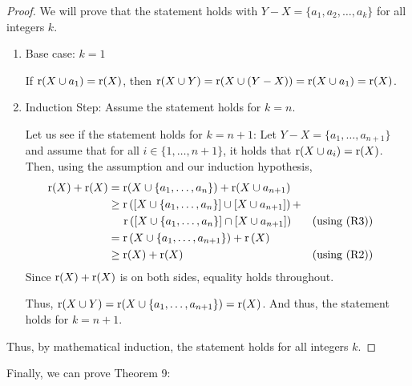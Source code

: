 \begin{proof}
    We will prove that the statement holds with $Y-X = \{a_1,a_2,\dots,a_k\}$ for all integers $k$.
    \begin{enumerate}
        \item Base case: $k=1$

        If $\operatorname{r}(X\cup a_1)=\operatorname{r}(X)$, then $\operatorname{r}(X\cup Y)=\operatorname{r}(X\cup(Y-X))=\operatorname{r}(X\cup a_1)=\operatorname{r}(X)$.
        \item Induction Step: Assume the statement holds for $k=n$. 
        
        Let us see if the statement holds for $k=n+1$: Let $Y-X=\{a_1,\dots,a_{n+1}\}$ and assume that for all $i\in\{1,\dots,n+1\}$, it holds that $\operatorname{r}(X\cup a_i)=\operatorname{r}(X)$. Then, using the assumption and our induction hypothesis, 
        \begin{align*}
            \operatorname{r}(X)+\operatorname{r}(X) &= \operatorname{r}(X\cup \{a_1,\dots,a_n\})+\operatorname{r}(X\cup a_{n+1}) 
            \\&\geq \operatorname{r}\left(\left[X\cup\{a_1,\dots,a_n\}\right]\cup \left[X\cup a_{n+1}\right]\right) +
             \\ &\quad\:  \operatorname{r}\left([X\cup\{a_1,\dots,a_n\}]\cap [X\cup a_{n+1}]\right)  && \text{(using (R3))}
            \\&= \operatorname{r}\left(X\cup\{a_1,\dots,a_{n+1}\}\right) + \operatorname{r}\left(X\right) 
            \\&\geq \operatorname{r}(X)+\operatorname{r}(X)  && \text{(using (R2)) }
        \end{align*}
        Since $\operatorname{r}(X)+\operatorname{r}(X)$ is on both sides, equality holds throughout. 
        
        Thus, $\operatorname{r}(X\cup Y) = \operatorname{r}(X\cup\{a_1,\dots,a_{n+1}\})=\operatorname{r}(X)$. And thus, the statement holds for $k=n+1$.
    \end{enumerate}
    Thus, by mathematical induction, the statement holds for all integers $k$.
\end{proof}
Finally, we can prove Theorem 9:
